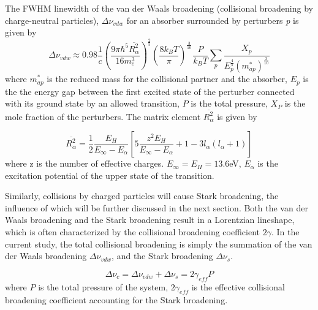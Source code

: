 \documentclass[12pt]{iopart}
\begin{document}
The FWHM linewidth of the van der Waals broadening (collisional broadening by charge-neutral particles), $\Delta \nu_{vdw}$ for an absorber surrounded by perturbers \textit{p} is given by\cite{Griem1964}
 \begin{equation}\label{eq:vdw_broadening}
     \Delta \nu_{vdw} \approx 0.98 \frac{1}{c}(\frac{9\pi \hbar^5 \overline{R^2_{\alpha}}}{16 m_e^3 })^{\frac{2}{5}} (\frac{8k_BT}{\pi})^{\frac{3}{10}}\frac{P}{k_B T}\sum_p \frac{X_p}{E_p^{\frac{4}{5}} (m^*_{ap})^{\frac{3}{10}}} 
 \end{equation}
where $m^*_{ap}$ is the reduced mass for the collisional partner and the absorber, $E_p$ is the the energy gap between the first excited state of the perturber connected with its ground state by an allowed transition, $P$ is the total pressure, $X_P$ is the mole fraction of the perturbers. The matrix element $\overline{R^2_{\alpha}}$ is given by 

\begin{equation}
    \overline{R^2_{\alpha}} = \frac{1}{2} \frac{E_H}{E_{\infty} - E_{\alpha} } [5\frac{z^2E_H}{E_{\infty} - E_{\alpha}} + 1 - 3l_{\alpha}(l_{\alpha}+ 1)] 
\end{equation}
where z is the number of effective charges. $E_{\infty}=E_H = 13.6$eV, $ E_{\alpha}$ is the excitation potential of the upper state of the transition.

Similarly, collisions by charged particles will cause Stark broadening, the influence of which will be further discussed in the next section. Both the van der Waals broadening and the Stark broadening result in a Lorentzian lineshape, which is often characterized by the collisional broadening coefficient $2\gamma$. In the current study, the total collisional broadening is simply the summation of the van der Waals broadening $\Delta \nu_{vdw}$, and the Stark broadening $\Delta \nu_{s}$.

\begin{equation}\label{eq:2gamma}
        \Delta \nu_c = \Delta \nu_{vdw} + \Delta \nu_s    = 2\gamma_{eff} P
\end{equation}
where $P$ is the total pressure of the system, $2\gamma_{eff}$ is the effective collisional broadening coefficient accounting for the Stark broadening.
\end{document}
